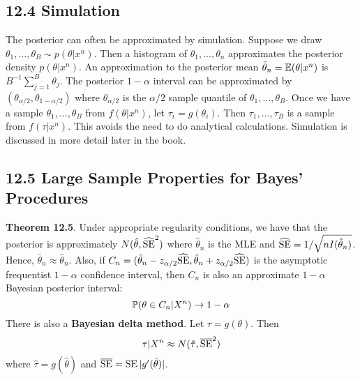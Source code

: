 \subsection*{12.4 Simulation}\label{bayesian:simulation}
The posterior can often be approximated by simulation. Suppose we draw
\(\theta_{1}, \dots, \theta_B \sim p(\theta | x^{n})\). Then a histogram of
\(\theta_{1}, \dots, \theta_{n}\) approximates the posterior density
\(p(\theta | x^{n})\). An approximation to the posterior mean
\(\bar{\theta}_{n} = \operatorname{\mathbb{E}}(\theta | x^{n})\) is
\(B^{-1} \sum_{j=1}^B \theta_{j}\). The posterior \(1 - \alpha\) interval
can be approximated by \((\theta_{\alpha/2}, \theta_{1 - \alpha/2})\)
where \(\theta_{\alpha/2}\) is the \(\alpha/2\) sample quantile of
\(\theta_{1}, \dots, \theta_B\).
Once we have a sample \(\theta_{1}, \dots, \theta_B\) from
\(f(\theta | x^{n})\), let \(\tau_{i} = g(\theta_{i})\). Then
\(\tau_{1}, \dots, \tau_B\) is a sample from \(f(\tau | x^{n})\). This
avoids the need to do analytical calculations. Simulation is discussed
in more detail later in the book.

\subsection*{12.5 Large Sample Properties for Bayes'
Procedures}\label{large-sample-properties-for-bayes-procedures}

\textbf{Theorem 12.5}. Under appropriate regularity conditions, we have
that the posterior is approximately
\(N(\hat{\theta}, \widehat{\operatorname{\mathrm{SE}}}^{2})\) where \(\hat{\theta}_{n}\) is the
MLE and \(\widehat{\operatorname{\mathrm{SE}}} = 1 / \sqrt{nI(\hat{\theta}_{n})}\). Hence,
\(\bar{\theta}_{n} \approx \hat{\theta}_{n}\). Also, if
\(C_{n} = (\hat{\theta}_{n} - z_{\alpha/2} \widehat{\operatorname{\mathrm{SE}}}, \hat{\theta}_{n} + z_{\alpha/2} \widehat{\operatorname{\mathrm{SE}}})\)
is the asymptotic frequentist \(1 - \alpha\) confidence interval, then
\(C_{n}\) is also an approximate \(1 - \alpha\) Bayesian posterior
interval:
\[
\operatorname{\mathbb{P}}(\theta \in C_{n} | X^{n}) \rightarrow 1 - \alpha
\]
There is also a \textbf{Bayesian delta method}. Let
\(\tau = g(\theta)\). Then
\[
\tau | X^{n} \approx N(\hat{\tau}, \overline{\operatorname{\mathrm{SE}}}^{2})
\]
where \(\hat{\tau} = g(\hat{\theta})\) and
\(\overline{\operatorname{\mathrm{SE}}} = \operatorname{\mathrm{SE}} | g'(\hat{\theta}) |\).

